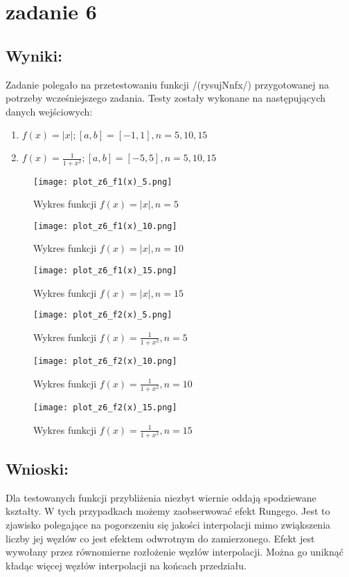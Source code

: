 \section{zadanie 6}

\subsection{Wyniki:}
Zadanie polegało na przetestowaniu funkcji /(rysujNnfx/) przygotowanej na potrzeby wcześniejszego zadania. Testy zostały wykonane na następujących danych wejściowych:
\begin{enumerate}
  \item \(f(x) = |x|; [a, b] = [-1, 1], n = 5, 10, 15 \)
  \item \(f(x) = \frac{1}{1 + x^2}; [a, b] = [-5, 5], n = 5, 10, 15 \)
\end{enumerate}

\begin{figure}[t]
  \centering
  \texttt{[image: plot\_z6\_f1(x)\_5.png]}
  \caption{Wykres funkcji \(f(x) = |x|, n = 5\)}
\end{figure}

\begin{figure}[t]
  \centering
  \texttt{[image: plot\_z6\_f1(x)\_10.png]}
  \caption{Wykres funkcji \(f(x) = |x|, n = 10\)}
\end{figure}

\begin{figure}[t]
  \centering
  \texttt{[image: plot\_z6\_f1(x)\_15.png]}
  \caption{Wykres funkcji \(f(x) = |x|, n = 15\)}
\end{figure}

\begin{figure}[t]
  \centering
  \texttt{[image: plot\_z6\_f2(x)\_5.png]}
  \caption{Wykres funkcji \(f(x) = \frac{1}{1+x^2}, n = 5\)}
\end{figure}

\begin{figure}[t]
  \centering
  \texttt{[image: plot\_z6\_f2(x)\_10.png]}
  \caption{Wykres funkcji \(f(x) = \frac{1}{1+x^2}, n = 10\)}
\end{figure}

\begin{figure}[t]
  \centering
  \texttt{[image: plot\_z6\_f2(x)\_15.png]}
  \caption{Wykres funkcji \(f(x) = \frac{1}{1+x^2}, n = 15\)}
\end{figure}

\subsection{Wnioski:}
Dla testowanych funkcji przybliżenia niezbyt wiernie oddają spodziewane kształty.
W tych przypadkach możemy zaobserwować efekt Rungego. Jest to zjawisko polegające na pogorszeniu się jakości interpolacji mimo zwiąkszenia liczby jej węzłów co jest efektem odwrotnym do zamierzonego. Efekt jest wywołany przez równomierne rozłożenie węzłów interpolacji. Można go uniknąć kładąc więcej węzłów interpolacji na końcach przedziału.
